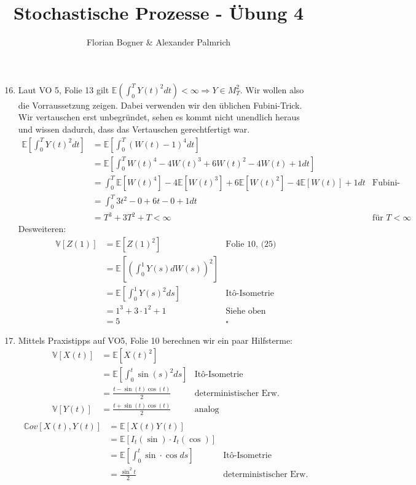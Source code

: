 \documentclass[a4paper,11pt,notitlepage,fullpage]{article}
\newcommand{\E}{\mathbb E}
\newcommand{\Ee}[1]{\mathbb E\left[#1\right]}
\newcommand{\Vv}[1]{\mathbb V\left[#1\right]}
\newcommand{\Cov}[1]{\mathbb Cov\left[#1\right]}
\begin{document}
\author{Florian Bogner \& Alexander Palmrich}
\title{Stochastische Prozesse - Übung 4}
\maketitle

\begin{enumerate}
\setcounter{enumi}{15}

\item Laut VO 5, Folie 13 gilt $\E(\int_0^T Y(t)^2 dt) < \infty \Rightarrow Y \in M_T^2$. Wir wollen also die Vorraussetzung zeigen. Dabei verwenden wir den üblichen Fubini-Trick. Wir vertauschen erst unbegründet, sehen es kommt nicht unendlich heraus und wissen dadurch, dass das Vertauschen gerechtfertigt war.
\begin{align*}
\Ee{\int_0^T Y(t)^2 dt} &= \Ee{\int_0^T (W(t)-1)^4 dt} \\
&= \Ee{\int_0^T W(t)^4 - 4W(t)^3 + 6W(t)^2 - 4W(t) + 1 dt} \\
&= \int_0^T \Ee{W(t)^4} - 4\Ee{W(t)^3} + 6\Ee{W(t)^2} - 4\Ee{W(t)} + 1 dt &\text{Fubini-Trick} \\
&= \int_0^T 3t^2 - 0 + 6t - 0 + 1 dt \\
&= T^3 + 3T^2 + T < \infty &\text{für $T < \infty$}
\end{align*}
Desweiteren:
\begin{align*}
\Vv{Z(1)} &= \Ee{Z(1)^2} &\text{Folie 10, (25)} \\
&= \Ee{\left(\int_0^1 Y(s) dW(s)  \right)^2} \\
&= \Ee{\int_0^1 Y(s)^2  ds} &\text{Itô-Isometrie} \\
&= 1^3 + 3\cdot1^2 + 1  &\text{Siehe oben} \\
&= 5 &\square
\end{align*}


\item Mittels Praxistipps auf VO5, Folie 10 berechnen wir ein paar Hilfsterme:
\begin{align*}
\Vv{X(t)} &= \Ee{X(t)^2} \\
&= \Ee{\int_0^t \sin(s)^2 ds} &\text{Itô-Isometrie} \\
&= \frac{t-\sin(t)\cos(t)}{2} &\text{deterministischer Erw.} \\
\Vv{Y(t)} &= \frac{t+\sin(t)\cos(t)}{2} &\text{analog}\\
\end{align*}
\begin{align*}
\Cov{X(t), Y(t)} &= \Ee{X(t) Y(t)}\\
&= \Ee{I_t (\sin) \cdot I_t (\cos)}\\
&= \Ee{\int_0^t \sin \cdot \cos ds}&\text{Itô-Isometrie} \\
&= \frac{\sin^2t}{2} &\text{deterministischer Erw.} \\
\end{align*}


\end{enumerate}
\end{document}
